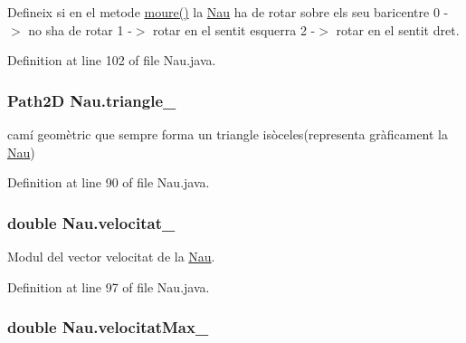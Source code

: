 Defineix si en el metode \hyperlink{class_nau_a8dc46f91e02910b92bfad9b798f6552c}{moure()} la \hyperlink{class_nau}{Nau} ha de rotar sobre els seu baricentre 0 -\/$>$ no s\textquotesingle{}ha de rotar 1 -\/$>$ rotar en el sentit esquerra 2 -\/$>$ rotar en el sentit dret. 



Definition at line 102 of file Nau.\+java.

\hypertarget{class_nau_ad397487e3dc0062cc71fdfc4c562e347}{}
\subsubsection[{triangle\+\_\+}]{\setlength{\rightskip}{0pt plus 5cm}Path2\+D Nau.\+triangle\+\_\+\hspace{0.3cm}{\ttfamily [protected]}}\label{class_nau_ad397487e3dc0062cc71fdfc4c562e347}


camí geomètric que sempre forma un triangle isòceles(representa gràficament la \hyperlink{class_nau}{Nau}) 



Definition at line 90 of file Nau.\+java.

\hypertarget{class_nau_ac1151817b8deaed7c77ceba3141b86e5}{}
\subsubsection[{velocitat\+\_\+}]{\setlength{\rightskip}{0pt plus 5cm}double Nau.\+velocitat\+\_\+\hspace{0.3cm}{\ttfamily [protected]}}\label{class_nau_ac1151817b8deaed7c77ceba3141b86e5}


Modul del vector velocitat de la \hyperlink{class_nau}{Nau}. 



Definition at line 97 of file Nau.\+java.

\hypertarget{class_nau_a6a18449674ed5d2317a6795bd56f7dd0}{}
\subsubsection[{velocitat\+Max\+\_\+}]{\setlength{\rightskip}{0pt plus 5cm}double Nau.\+velocitat\+Max\+\_\+\hspace{0.3cm}{\ttfamily [private]}}\label{class_nau_a6a18449674ed5d2317a6795bd56f7dd0}


